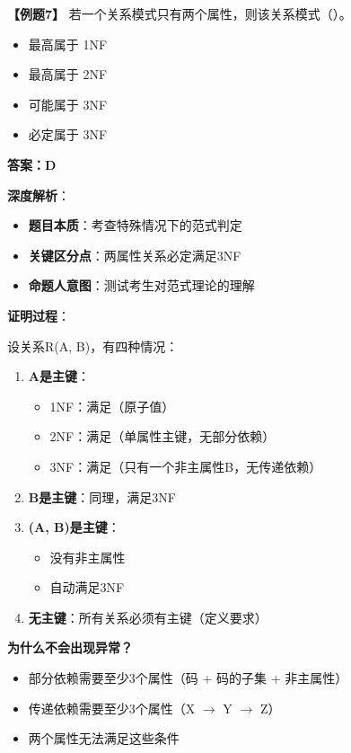 \documentclass[12pt, a4paper]{article}
\newenvironment{bluebox}[1]{%
  \begin{trivlist}
  \item[\hskip\labelsep \textbf{#1}]
  \setlength{\parskip}{0.5ex}
  \setlength{\itemsep}{0.5ex}
}{%
  \end{trivlist}
  }
\begin{document}
\begin{bluebox}{例题7：规范化程度}
	\textbf{【例题7】} 若一个关系模式只有两个属性，则该关系模式（\quad）。

	\begin{itemize}
		\item[A)] 最高属于 1NF
		\item[B)] 最高属于 2NF
		\item[C)] 可能属于 3NF
		\item[D)] 必定属于 3NF
	\end{itemize}

	\textbf{答案：D}

	\textbf{深度解析}：

	\begin{itemize}[leftmargin=*, nosep]
		\item \textbf{题目本质}：考查特殊情况下的范式判定
		\item \textbf{关键区分点}：两属性关系必定满足3NF
		\item \textbf{命题人意图}：测试考生对范式理论的理解
	\end{itemize}

	\textbf{证明过程}：

	设关系R(A, B)，有四种情况：

	\begin{enumerate}
		\item \textbf{A是主键}：
		      \begin{itemize}[nosep]
			      \item 1NF：满足（原子值）
			      \item 2NF：满足（单属性主键，无部分依赖）
			      \item 3NF：满足（只有一个非主属性B，无传递依赖）
		      \end{itemize}
		\item \textbf{B是主键}：同理，满足3NF
		\item \textbf{(A, B)是主键}：
		      \begin{itemize}[nosep]
			      \item 没有非主属性
			      \item 自动满足3NF
		      \end{itemize}
		\item \textbf{无主键}：所有关系必须有主键（定义要求）
	\end{enumerate}

	\textbf{为什么不会出现异常？}
	\begin{itemize}
		\item 部分依赖需要至少3个属性（码 + 码的子集 + 非主属性）
		\item 传递依赖需要至少3个属性（X $\to$ Y $\to$ Z）
		\item 两个属性无法满足这些条件
	\end{itemize}


\end{bluebox}
\end{document}
